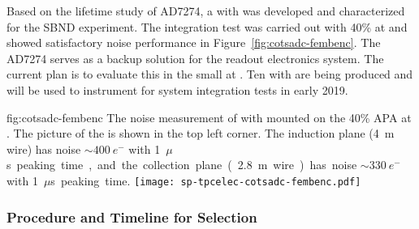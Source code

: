 Based on the lifetime study of AD7274, a  with  
 was developed and characterized for the SBND experiment. The 
integration test was carried out with 40\%  at  and 
showed satisfactory noise performance in Figure~\ref{fig:cotsadc-fembenc}. 
The   AD7274 serves as a backup solution for the 
   readout electronics system. The current 
plan is to evaluate this  in the small  
 at . Ten  with  
 are being produced and will be used to instrument  
 for system integration tests in early 2019. 

\begin{dunefigure}
{fig:cotsadc-fembenc}
{The noise measurement of  with   
mounted on the \num{40}\% APA at . The picture of the 
 is shown in the top left corner. The induction plane 
(\SI{4}{m} wire) has noise $\sim\SI{400}{e^-}$ with \SI{1}{$\mu$s} 
peaking time, and the collection plane (\SI{2.8}{m} wire) has noise 
$\sim\SI{330}{e^-}$ with \SI{1}{$\mu$s} peaking time.}
\texttt{[image: sp-tpcelec-cotsadc-fembenc.pdf]}
\end{dunefigure}

\subsubsection{Procedure and Timeline for  Selection}
\label{sec:fdsp-tpcelec-design-femb-selection}

